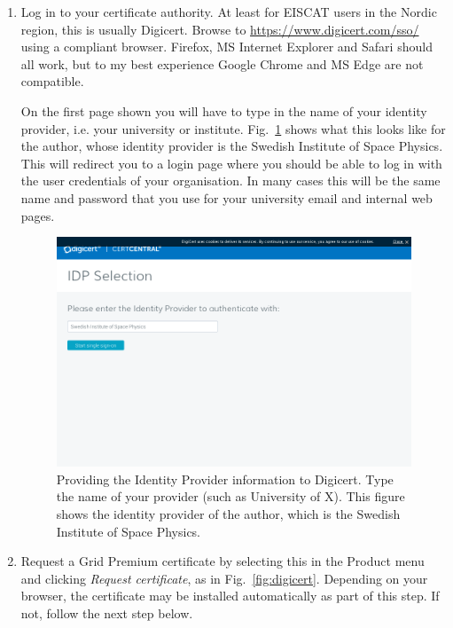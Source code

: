 \documentclass[a4paper]{article}
\begin{document}
\begin{enumerate}


\item Log in to your certificate authority. At least for EISCAT users
  in the Nordic region, this is usually Digicert. Browse to
  \url{https://www.digicert.com/sso/} using a compliant
  browser. Firefox, MS Internet Explorer and Safari should all work,
  but to my best experience Google Chrome and MS Edge are not compatible. 

  On the first page shown you will have to type in the name of your
  identity provider, i.e. your university or
  institute. Fig.~\ref{fig:idp} shows what this looks like for the
  author, whose identity provider is the Swedish Institute of Space
  Physics. This will redirect you to a login page where you should be
  able to log in with the user credentials of your organisation. In
  many cases this will be the same name and password that you use for
  your university email and internal web pages.

  \begin{figure}[htb]
    \centering
    \includegraphics[width=1.0\linewidth]{idp-provider}
    \caption{Providing the Identity Provider information to Digicert. Type the name of your provider (such as University of X). This figure shows the identity provider of the author, which is the Swedish Institute of Space Physics.}
    \label{fig:idp}
  \end{figure}

\item Request a Grid Premium certificate by selecting this in the
  Product menu and clicking \emph{Request certificate}, as in
  Fig.~\ref{fig:digicert}.  Depending on your browser, the certificate
  may be installed automatically as part of this step. If not, follow
  the next step below.


\end{enumerate}
\end{document}
